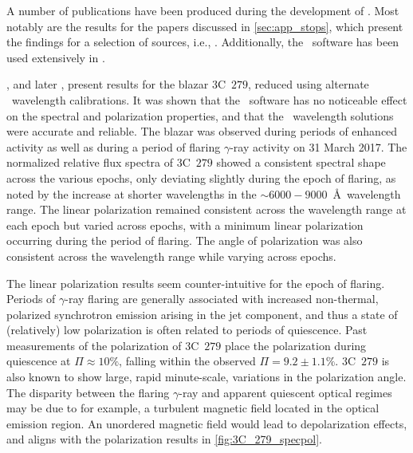 A number of publications have been produced during the development of \stops.
Most notably are the results for the papers discussed in \autoref{sec:app_stops}, which present the findings for a selection of sources, i.e., \citet{Buckley191221B, Cooper_HEASA2021, Cooper_HEASA2022, Schutte4C0102}.
Additionally, the \stops\ software has been used extensively in \citet{Barnard_HEASA2021, Barnard_2024, Barnard_thesis}.


\citet{Cooper_HEASA2021}, and later \citet{Cooper_HEASA2022}, present results for the blazar $3$C~$279$, reduced using alternate \iraf\ wavelength calibrations.
It was shown that the \stops\ software has no noticeable effect on the spectral and polarization properties, and that the \iraf\ wavelength solutions were accurate and reliable.
The blazar was observed during periods of enhanced activity as well as during a period of flaring $\gamma$-ray activity on 31 March 2017.
The normalized relative flux spectra of $3$C~$279$ showed a consistent spectral shape across the various epochs, only deviating slightly during the epoch of flaring, as noted by the increase at shorter wavelengths in the $\sim 6000 - 9000$~\AA\ wavelength range.
The linear polarization remained consistent across the wavelength range at each epoch but varied across epochs, with a minimum linear polarization occurring during the period of flaring.
The angle of polarization was also consistent across the wavelength range while varying across epochs.

The linear polarization results seem counter-intuitive for the epoch of flaring.
Periods of $\gamma$-ray flaring are generally associated with increased non-thermal, polarized synchrotron emission arising in the jet component, and thus a state of (relatively) low polarization is often related to periods of quiescence.
Past measurements of the polarization of 3C~$279$ place the polarization during quiescence at $\Pi \approx 10 \%$, falling within the observed $\Pi = 9.2 \pm 1.1\%$.
3C~$279$ is also known to show large, rapid minute-scale, variations in the polarization angle.
The disparity between the flaring $\gamma$-ray and apparent quiescent optical regimes may be due to for example, a turbulent magnetic field located in the optical emission region.
An unordered magnetic field would lead to depolarization effects, and aligns with the polarization results in \autoref{fig:3C_279_specpol}.

